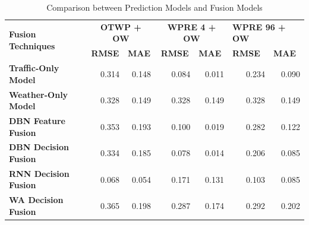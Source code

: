 \begin{table}[]
\begin{tabular}{|l|r|r|r|r|r|r|}
\hline
\multirow{2}{*}{\textbf{Fusion Techniques}} & \multicolumn{2}{c|}{\textbf{OTWP + OW}}                                & \multicolumn{2}{c|}{\textbf{WPRE 4 + OW}}                              & \multicolumn{2}{l|}{\textbf{WPRE 96 + OW}}                             \\ \cline{2-7} 
                                            & \multicolumn{1}{c|}{\textbf{RMSE}} & \multicolumn{1}{l|}{\textbf{MAE}} & \multicolumn{1}{c|}{\textbf{RMSE}} & \multicolumn{1}{l|}{\textbf{MAE}} & \multicolumn{1}{l|}{\textbf{RMSE}} & \multicolumn{1}{l|}{\textbf{MAE}} \\ \hline
\textbf{Traffic-Only Model}                 & 0.314                              & 0.148                             & 0.084                              & 0.011                             & 0.234                              & 0.090                             \\ \hline
\textbf{Weather-Only Model}                 & 0.328                              & 0.149                             & 0.328                              & 0.149                             & 0.328                              & 0.149                             \\ \hline
\textbf{DBN Feature Fusion}                 & 0.353                              & 0.193                             & 0.100                              & 0.019                             & 0.282                              & 0.122                             \\ \hline
\textbf{DBN Decision Fusion}                & 0.334                              & 0.185                             & 0.078                              & 0.014                             & 0.206                              & 0.085                             \\ \hline
\textbf{RNN Decision Fusion}                & 0.068                              & 0.054                             & 0.171                              & 0.131                             & 0.103                              & 0.085                             \\ \hline
\textbf{WA Decision Fusion}                 & 0.365                              & 0.198                             & 0.287                              & 0.174                             & 0.292                              & 0.202                             \\ \hline
\end{tabular}
\caption{Comparison between Prediction Models and Fusion Models}
\label{table:fusion_results}
\end{table}


